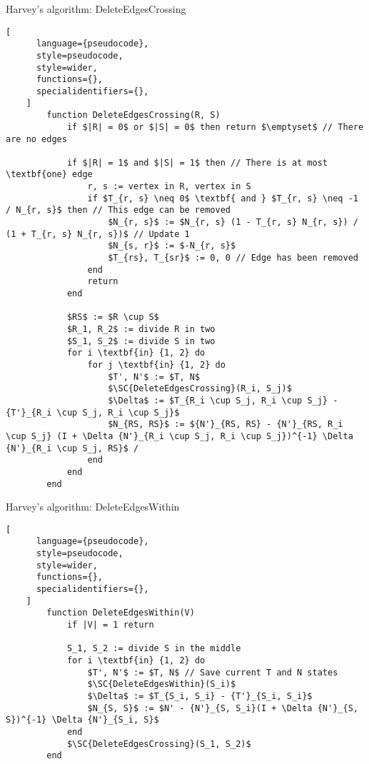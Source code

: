 \begin{programruledcaption}{Harvey's algorithm: DeleteEdgesCrossing}
    \begin{lstlisting}[
      language={pseudocode},
      style=pseudocode,
      style=wider,
      functions={},
      specialidentifiers={},
    ]
        function DeleteEdgesCrossing(R, S)
            if $|R| = 0$ or $|S| = 0$ then return $\emptyset$ // There are no edges

            if $|R| = 1$ and $|S| = 1$ then // There is at most \textbf{one} edge
                r, s := vertex in R, vertex in S
                if $T_{r, s} \neq 0$ \textbf{ and } $T_{r, s} \neq -1 / N_{r, s}$ then // This edge can be removed
                    $N_{r, s}$ := $N_{r, s} (1 - T_{r, s} N_{r, s}) / (1 + T_{r, s} N_{r, s})$ // Update 1
                    $N_{s, r}$ := $-N_{r, s}$
                    $T_{rs}, T_{sr}$ := 0, 0 // Edge has been removed
                end
                return
            end

            $RS$ := $R \cup S$
            $R_1, R_2$ := divide R in two 
            $S_1, S_2$ := divide S in two
            for i \textbf{in} {1, 2} do
                for j \textbf{in} {1, 2} do
                    $T', N'$ := $T, N$
                    $\SC{DeleteEdgesCrossing}(R_i, S_j)$
                    $\Delta$ := $T_{R_i \cup S_j, R_i \cup S_j} - {T'}_{R_i \cup S_j, R_i \cup S_j}$
                    $N_{RS, RS}$ := ${N'}_{RS, RS} - {N'}_{RS, R_i \cup S_j} (I + \Delta {N'}_{R_i \cup S_j, R_i \cup S_j})^{-1} \Delta {N'}_{R_i \cup S_j, RS}$ /
                end
            end
        end
    \end{lstlisting}
\end{programruledcaption}

\begin{programruledcaption}{Harvey's algorithm: DeleteEdgesWithin}
    \begin{lstlisting}[
      language={pseudocode},
      style=pseudocode,
      style=wider,
      functions={},
      specialidentifiers={},
    ]
        function DeleteEdgesWithin(V)
            if |V| = 1 return

            S_1, S_2 := divide S in the middle
            for i \textbf{in} {1, 2} do
                $T', N'$ := $T, N$ // Save current T and N states
                $\SC{DeleteEdgesWithin}(S_i)$
                $\Delta$ := $T_{S_i, S_i} - {T'}_{S_i, S_i}$
                $N_{S, S}$ := $N' - {N'}_{S, S_i}(I + \Delta {N'}_{S, S})^{-1} \Delta {N'}_{S_i, S}$ 
            end
            $\SC{DeleteEdgesCrossing}(S_1, S_2)$
        end
    \end{lstlisting}
\end{programruledcaption}


